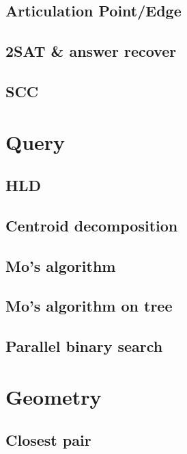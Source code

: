\documentclass[10pt,landscape,a4paper,twocolumn]{article}
\begin{document}
\subsection{Articulation Point/Edge}
\lstinputlising{}

\subsection{2SAT & answer recover}
\lstinputlising{}

\subsection{SCC}
\lstinputlising{}

\section{Query}
\subsection{HLD}


\subsection{Centroid decomposition}


\subsection{Mo's algorithm}


\subsection{Mo's algorithm on tree}


\subsection{Parallel binary search}



\section{Geometry}
\subsection{Closest pair}

\end{document}
